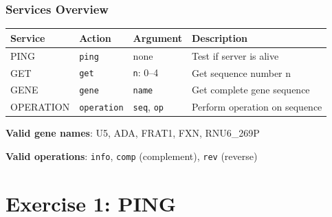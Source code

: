 \documentclass[xcolor=table]{beamer}
\begin{document}
\begin{frame}
\frametitle{Services Overview}

\begingroup\small
\begin{center}
\begin{tabular}{|l|l|l|p{3cm}|}
\hline
\textbf{Service} & \textbf{Action} & \textbf{Argument} & \textbf{Description} \\
\hline
PING & \texttt{ping} & none & Test if server is alive \\
\hline
GET & \texttt{get} & \texttt{n}: 0--4 & Get sequence number n \\
\hline
GENE & \texttt{gene} & \texttt{name} & Get complete gene sequence \\
\hline
OPERATION & \texttt{operation} & \texttt{seq}, \texttt{op} & Perform operation on sequence \\
\hline
\end{tabular}
\end{center}
\endgroup

\vspace{0.2cm}

\textbf{Valid gene names}: U5, ADA, FRAT1, FXN, RNU6\_269P

\vspace{0.2cm}

\textbf{Valid operations}: \texttt{info}, \texttt{comp} (complement), \texttt{rev} (reverse)

\end{frame}


\section{Exercise 1: PING}
\end{document}
